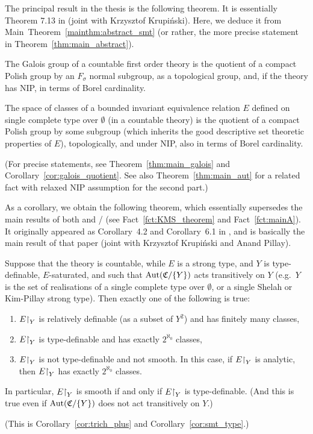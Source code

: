 	The principal result in the thesis is the following theorem. It is essentially Theorem 7.13 in \cite{KR18} (joint with Krzysztof Krupiński). Here, we deduce it from Main~Theorem~\ref{mainthm:abstract_smt} (or rather, the more precise statement in Theorem~\ref{thm:main_abstract}).
	\begin{mainthm}
		\label{mainthm_group_types}
		The Galois group of a countable first order theory is the quotient of a compact Polish group by an $F_\sigma$ normal subgroup, as a topological group, and, if the theory has NIP, in terms of Borel cardinality.
		
		The space of classes of a bounded invariant equivalence relation $E$ defined on single complete type over $\emptyset$ (in a countable theory) is the quotient of a compact Polish group by some subgroup (which inherits the good descriptive set theoretic properties of $E$), topologically, and under NIP, also in terms of Borel cardinality.
	\end{mainthm}
	(For precise statements, see Theorem~\ref{thm:main_galois} and Corollary~\ref{cor:galois_quotient}. See also Theorem~\ref{thm:main_aut} for a related fact with relaxed NIP assumption for the second part.)
	
	As a corollary, we obtain the following theorem, which essentially supersedes the main results of both  \cite{KMS14} and \cite{KM14}/\cite{KR16} (see Fact~\ref{fct:KMS_theorem} and Fact~\ref{fct:mainA}). It originally appeared as Corollary~4.2 and Corollary~6.1 in \cite{KPR15}, and is basically the main result of that paper (joint with Krzysztof Krupiński and Anand Pillay).
	\begin{mainthm}
		\label{mainthm:smt}
		Suppose that the theory is countable, while $E$ is a strong type, and $Y$ is type-definable, $E$-saturated, and such that $\operatorname{{Aut}}({\mathfrak C}/\{Y\})$ acts transitively on $Y$ (e.g.\ $Y$ is the set of realisations of a single complete type over $\emptyset$, or a single Shelah or Kim-Pillay strong type). Then exactly one of the following is true:
		\begin{enumerate}
			\item
			$E\mathord{\upharpoonright}_Y$ is relatively definable (as a subset of $Y^2$) and has finitely many classes,
			\item
			$E\mathord{\upharpoonright}_Y$ is type-definable and has exactly $2^{\aleph_0}$ classes,
			\item
			$E\mathord{\upharpoonright}_Y$ is not type-definable and not smooth. In this case, if $E\mathord{\upharpoonright}_Y$ is analytic, then $E\mathord{\upharpoonright}_Y$ has exactly $2^{\aleph_0}$ classes.
		\end{enumerate}
		In particular, $E\mathord{\upharpoonright}_Y$ is smooth if and only if $E\mathord{\upharpoonright}_Y$ is type-definable. (And this is true even if $\operatorname{{Aut}}({\mathfrak C}/\{Y\})$ does not act transitively on $Y$.)
	\end{mainthm}
	(This is Corollary~\ref{cor:trich_plus} and Corollary~\ref{cor:smt_type}.)
	
